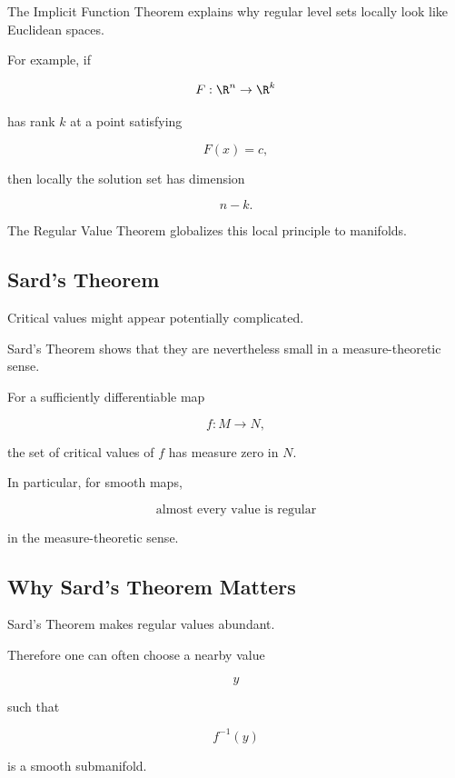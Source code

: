 The Implicit Function Theorem explains why regular level sets locally look
like Euclidean spaces.

For example, if

\[
F:\R^n\to\R^k
\]

has rank \(k\) at a point satisfying

\[
F(x)=c,
\]

then locally the solution set has dimension

\[
\boxed{
n-k.
}
\]

The Regular Value Theorem globalizes this local principle to manifolds.

\subsection{Sard's Theorem}
\label{subsec:sards-theorem}

Critical values might appear potentially complicated.

Sard's Theorem shows that they are nevertheless small in a measure-theoretic
sense.

\begin{theorem}
For a sufficiently differentiable map

\[
f:M\to N,
\]

the set of critical values of \(f\) has measure zero in \(N\).
\end{theorem}

In particular, for smooth maps,

\[
\boxed{
\text{almost every value is regular}
}
\]

in the measure-theoretic sense.

\subsection{Why Sard's Theorem Matters}
\label{subsec:why-sard-matters}

Sard's Theorem makes regular values abundant.

Therefore one can often choose a nearby value

\[
y
\]

such that

\[
f^{-1}(y)
\]

is a smooth submanifold.

